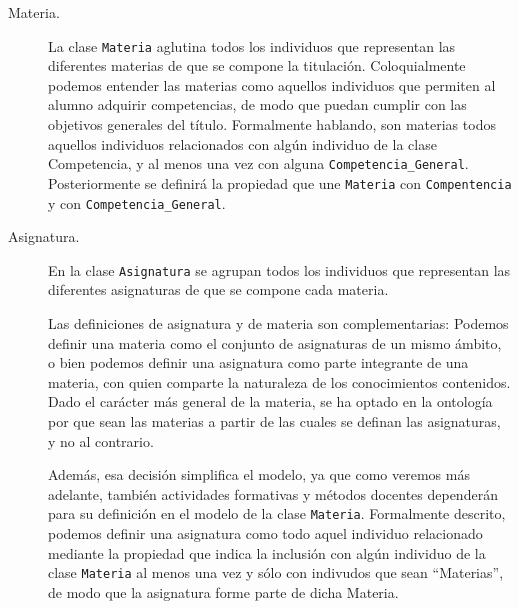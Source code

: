 \begin{description}
      
		\item[Materia.]La clase \lstinline!Materia! aglutina todos los individuos que representan las diferentes materias de que se compone la titulación. Coloquialmente podemos entender las materias como aquellos individuos que permiten al alumno adquirir competencias, de modo que puedan cumplir con las objetivos generales del título. Formalmente hablando, son materias todos aquellos individuos relacionados con algún individuo de la clase Competencia, y al menos una vez con alguna \lstinline!Competencia_General!. Posteriormente se definirá la propiedad que une \lstinline!Materia! con \lstinline!Compentencia! y con \lstinline!Competencia_General!. 
			
      
      
      
      
		\item[Asignatura.]En la clase \lstinline!Asignatura! se agrupan todos los individuos que representan las diferentes asignaturas de que se compone cada materia. 
		
		Las definiciones de asignatura y de materia son complementarias: Podemos definir una materia como el conjunto de asignaturas de un mismo ámbito, o bien podemos definir una asignatura como parte integrante de una materia, con quien comparte la naturaleza de los conocimientos contenidos. Dado el carácter más general de la materia, se ha optado en la ontología por que sean las materias a partir de las cuales se definan las asignaturas, y no al contrario. 
		
      	Además, esa decisión simplifica el modelo, ya que como veremos más adelante, también actividades formativas y métodos docentes dependerán para su definición en el modelo de la clase \lstinline!Materia!. Formalmente descrito, podemos definir una asignatura como todo aquel individuo relacionado mediante la propiedad que indica la inclusión con algún individuo de la clase \lstinline!Materia! al menos una vez y sólo con indivudos que sean ``Materias'', de modo que la asignatura forme parte de dicha Materia.
      		
      

\end{description}
